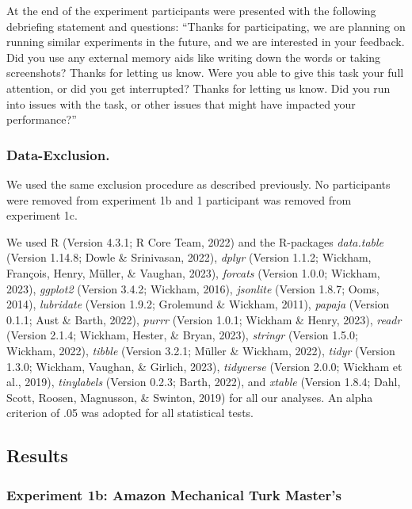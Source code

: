 \documentclass[
  man,floatsintext]{apa6}
\begin{document}
At the end of the experiment participants were presented with the following debriefing statement and questions: ``Thanks for participating, we are planning on running similar experiments in the future, and we are interested in your feedback. Did you use any external memory aids like writing down the words or taking screenshots? Thanks for letting us know. Were you able to give this task your full attention, or did you get interrupted? Thanks for letting us know. Did you run into issues with the task, or other issues that might have impacted your performance?''

\hypertarget{data-exclusion.-1}{%
\subsubsection{Data-Exclusion.}\label{data-exclusion.-1}}

We used the same exclusion procedure as described previously. No participants were removed from experiment 1b and 1 participant was removed from experiment 1c.

We used R (Version 4.3.1; R Core Team, 2022) and the R-packages \emph{data.table} (Version 1.14.8; Dowle \& Srinivasan, 2022), \emph{dplyr} (Version 1.1.2; Wickham, François, Henry, Müller, \& Vaughan, 2023), \emph{forcats} (Version 1.0.0; Wickham, 2023), \emph{ggplot2} (Version 3.4.2; Wickham, 2016), \emph{jsonlite} (Version 1.8.7; Ooms, 2014), \emph{lubridate} (Version 1.9.2; Grolemund \& Wickham, 2011), \emph{papaja} (Version 0.1.1; Aust \& Barth, 2022), \emph{purrr} (Version 1.0.1; Wickham \& Henry, 2023), \emph{readr} (Version 2.1.4; Wickham, Hester, \& Bryan, 2023), \emph{stringr} (Version 1.5.0; Wickham, 2022), \emph{tibble} (Version 3.2.1; Müller \& Wickham, 2022), \emph{tidyr} (Version 1.3.0; Wickham, Vaughan, \& Girlich, 2023), \emph{tidyverse} (Version 2.0.0; Wickham et al., 2019), \emph{tinylabels} (Version 0.2.3; Barth, 2022), and \emph{xtable} (Version 1.8.4; Dahl, Scott, Roosen, Magnusson, \& Swinton, 2019) for all our analyses. An alpha criterion of .05 was adopted for all statistical tests.

\hypertarget{results}{%
\subsection{Results}\label{results}}

\hypertarget{experiment-1b-amazon-mechanical-turk-masters}{%
\subsubsection{Experiment 1b: Amazon Mechanical Turk Master's}\label{experiment-1b-amazon-mechanical-turk-masters}}
\end{document}
